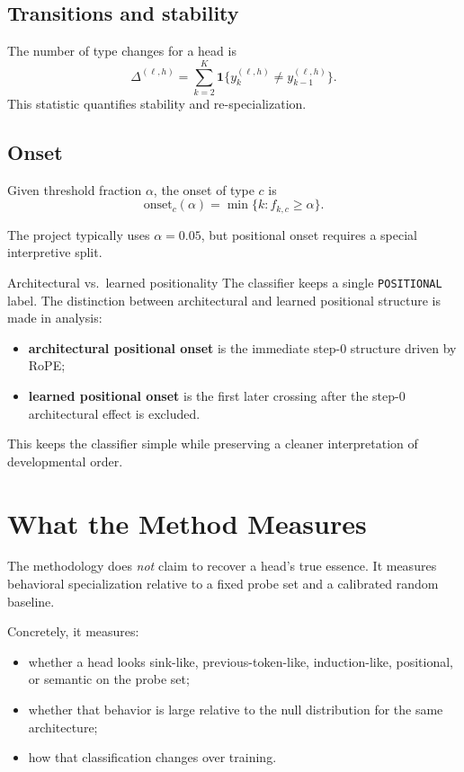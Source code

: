 \documentclass[11pt]{article}
\newcommand{\1}{\mathbf{1}}
\begin{document}
\subsection{Transitions and stability}

The number of type changes for a head is
\[
\Delta^{(\ell,h)}
=
\sum_{k=2}^{K}
\1\{y_k^{(\ell,h)} \neq y_{k-1}^{(\ell,h)}\}.
\]
This statistic quantifies stability and re-specialization.

\subsection{Onset}

Given threshold fraction $\alpha$, the onset of type $c$ is
\[
\mathrm{onset}_c(\alpha) = \min\{k : f_{k,c} \ge \alpha\}.
\]

The project typically uses $\alpha = 0.05$, but positional onset requires a
special interpretive split.

\begin{accentbox}{Architectural vs.\ learned positionality}
The classifier keeps a single \texttt{POSITIONAL} label. The distinction between
architectural and learned positional structure is made in analysis:
\begin{itemize}
\item \textbf{architectural positional onset} is the immediate step-0 structure
driven by RoPE;
\item \textbf{learned positional onset} is the first later crossing after the
step-0 architectural effect is excluded.
\end{itemize}
This keeps the classifier simple while preserving a cleaner interpretation of
developmental order.
\end{accentbox}

\section{What the Method Measures}

The methodology does \emph{not} claim to recover a head's true essence. It
measures behavioral specialization relative to a fixed probe set and a
calibrated random baseline.

Concretely, it measures:
\begin{itemize}
\item whether a head looks sink-like, previous-token-like, induction-like,
positional, or semantic on the probe set;
\item whether that behavior is large relative to the null distribution for the
same architecture;
\item how that classification changes over training.
\end{itemize}
\end{document}
